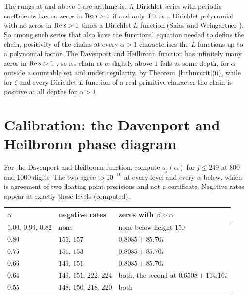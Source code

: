 The rungs at and above $1$ are arithmetic. A Dirichlet series with periodic coefficients has no zeros in $\operatorname{Re} s>1$ if and only if it is a Dirichlet polynomial with no zeros in $\operatorname{Re} s>1$ times a Dirichlet $L$ function (Saias and Weingartner \cite{SaiasWeingartner09}). So among such series that also have the functional equation needed to define the chain, positivity of the chains at every $\alpha>1$ characterises the $L$ functions up to a polynomial factor. The Davenport and Heilbronn function has infinitely many zeros in $\operatorname{Re} s>1$ \cite{DH36}, so its chain at $\alpha$ slightly above $1$ fails at some depth, for $\alpha$ outside a countable set and under regularity, by Theorem~\ref{h:thm:crit}(ii), while for $\zeta$ and every Dirichlet $L$ function of a real primitive character the chain is positive at all depths for $\alpha>1$.

\section{Calibration: the Davenport and Heilbronn phase diagram}

\begin{computation}\label{h:comp:phase}
For the Davenport and Heilbronn function, compute $a_j(\alpha)$ for $j\le249$ at $800$ and $1000$ digits. %
The two agree to $10^{-10}$ at every level and every $\alpha$ below, which is agreement of two floating point precisions and not a certificate. Negative rates appear at exactly these levels (computed).
\begin{center}\small
\begin{tabular}{@{}p{}p{}p{}@{}}
\toprule
$\alpha$ & negative rates & zeros with $\beta>\alpha$\\
\midrule
$1.00$, $0.90$, $0.82$ & none & none below height $150$\\
$0.80$ & $155$, $157$ & $0.8085+85.70i$\\
$0.75$ & $151$, $153$ & $0.8085+85.70i$\\
$0.66$ & $149$, $151$ & $0.8085+85.70i$\\
$0.64$ & $149$, $151$, $222$, $224$ & both, the second at $0.6508+114.16i$\\
$0.55$ & $148$, $150$, $218$, $220$ & both\\
\bottomrule
\end{tabular}
\end{center}
\end{computation}

